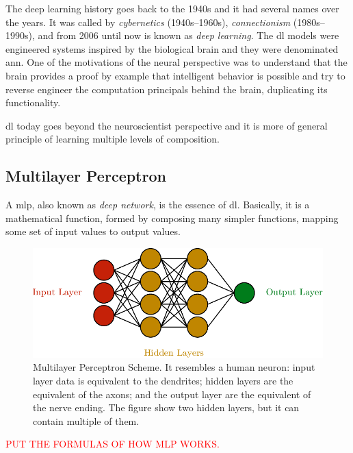 The deep learning history goes back to the 1940s and it had several names over the years. It was called by \emph{cybernetics} (1940s--1960s), \emph{connectionism} (1980s--1990s), and from 2006 until now is known as \emph{deep learning}.
The \gls*{dl} models were engineered systems inspired by the biological brain and they were denominated \gls*{ann}.
One of the motivations of the neural perspective was to understand that the brain provides a proof by example that intelligent behavior is possible and try to reverse engineer the computation principals behind the brain, duplicating its functionality.

\gls*{dl} today goes beyond the neuroscientist perspective and it is more of general principle of learning multiple levels of composition.

\subsection{Multilayer Perceptron}

A \gls*{mlp}, also known as \emph{deep network}, is the essence of \gls*{dl}. Basically, it is a mathematical function, formed by composing many simpler functions, mapping some set of input values to output values.
%
\begin{figure}[H]
    \centering
    \includegraphics{figures/2methodology/nn/mlp.pdf}
    \caption[Multilayer Perceptron Scheme]{Multilayer Perceptron Scheme. It resembles a human neuron: input layer data is equivalent to the dendrites; hidden layers are the equivalent of the axons; and the output layer are the equivalent of the nerve ending. The figure show two hidden layers, but it can contain multiple of them.}
\end{figure}

\noindent\textcolor{red}{PUT THE FORMULAS OF HOW MLP WORKS.}